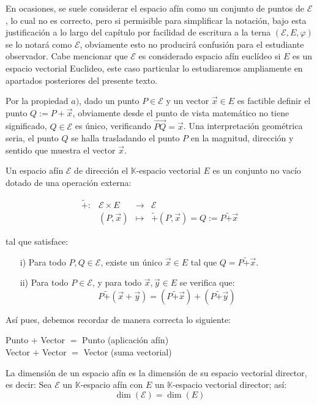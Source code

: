 \documentclass[11pt,a4paper,twoside]{book}\usepackage[]{graphicx}\usepackage[]{color}
\newcommand{\m}[1]{\mathbb{#1}}
\newcommand{\C}[1]{\mathcal{#1}}
\newcommand{\fu}[5]{\begin{array}{rccl} #1:&#2&\to&#3\\ &#4&\mapsto&#5\end{array}}
\newcommand{\ora}[1]{\overrightarrow{#1}}
\newcommand{\wt}[1]{\widetilde{#1}}
\begin{document}
En ocasiones, se suele considerar el espacio afín como un conjunto de puntos de $\C{E}$, lo cual no es correcto, pero si permisible para simplificar la notación, bajo esta justificación a lo largo del capítulo por facilidad de escritura a la terna $(\C{E}, E, \varphi)$ se lo notará como $\C{E}$, obviamente esto no producirá confusión para el estudiante observador. Cabe mencionar que $\C{E}$ es considerado espacio afín euclídeo si $E$ es un espacio vectorial Euclideo, este caso particular lo estudiaremos ampliamente en apartados posteriores del presente texto.\newline

Por la propiedad $a)$, dado un punto $P\in \C{E}$ y un vector $\ora{x}\in E$ es factible definir el punto $Q:= P+\ora{x}$, obviamente desde el punto de vista matemático no tiene significado, $Q\in \C{E}$ es único, verificando $\ora{PQ}=\ora{x}$. Una interpretación geométrica seria, el punto $Q$ se halla trasladando el punto $P$ en la magnitud, dirección y sentido que muestra el vector $\ora{x}$. 

\begin{definition}
Un espacio afín $\C{E}$ de dirección el $\m{K}$-espacio vectorial $E$ es un conjunto no vacío dotado de una operación externa:

\[\fu{\wt{+}}{\C{E}\times E}{\C{E}}{(P,\ora{x})}{\wt{+}(P, \ora{x})=Q:=P\wt{+} \ora{x}}\]

tal que satisface:
\begin{itemize}
      \item [i)] Para todo $P, Q\in \C{E}$, existe un único $\ora{x}\in E$ tal que $Q=P\wt{+} \ora{x}$.
      \item [ii)] Para todo $P\in \C{E}$, y para todo $\ora{x}, \ora{y}\in E$ se verifica que:
      \[P\wt{+}(\ora{x}+\ora{y}) = (P\wt{+}\ora{x}) + (P\wt{+}\ora{y})\]
\end{itemize}
\end{definition}

Así pues, debemos recordar de manera correcta lo siguiente:

\begin{center}
Punto $+$ Vector $=$ Punto (aplicación afín)\\
Vector $+$ Vector $=$ Vector (suma vectorial)
\end{center}

\begin{definition}
La dimensión de un espacio afín es la dimensión de su espacio vectorial director, es decir:\newline
Sea $\C{E}$ un $\m{K}$-espacio afín con $E$ un $\m{K}$-espacio vectorial director; así:
\[\dim (\C{E})=\dim (E)\]
\end{definition}
\end{document}
